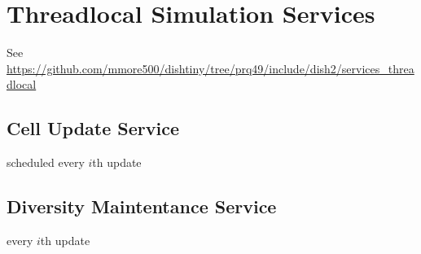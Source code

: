 \section{Threadlocal Simulation Services}

See \url{https://github.com/mmore500/dishtiny/tree/prq49/include/dish2/services_threadlocal}

\subsection{Cell Update Service}

scheduled every $i$th update

\subsection{Diversity Maintentance Service}

every $i$th update